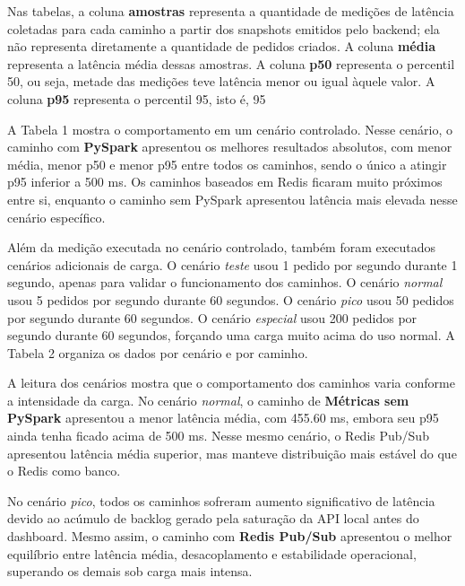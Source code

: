 ﻿\documentclass{article}
\begin{document}
Nas tabelas, a coluna \textbf{amostras} representa a quantidade de medições de latência coletadas para cada caminho a partir dos snapshots emitidos pelo backend; ela não representa diretamente a quantidade de pedidos criados. A coluna \textbf{média} representa a latência média dessas amostras. A coluna \textbf{p50} representa o percentil 50, ou seja, metade das medições teve latência menor ou igual àquele valor. A coluna \textbf{p95} representa o percentil 95, isto é, 95%

A Tabela 1 mostra o comportamento em um cenário controlado. Nesse cenário, o caminho com \textbf{PySpark} apresentou os melhores resultados absolutos, com menor média, menor p50 e menor p95 entre todos os caminhos, sendo o único a atingir p95 inferior a 500 ms. Os caminhos baseados em Redis ficaram muito próximos entre si, enquanto o caminho sem PySpark apresentou latência mais elevada nesse cenário específico.

Além da medição executada no cenário controlado, também foram executados cenários adicionais de carga. O cenário \textit{teste} usou 1 pedido por segundo durante 1 segundo, apenas para validar o funcionamento dos caminhos. O cenário \textit{normal} usou 5 pedidos por segundo durante 60 segundos. O cenário \textit{pico} usou 50 pedidos por segundo durante 60 segundos. O cenário \textit{especial} usou 200 pedidos por segundo durante 60 segundos, forçando uma carga muito acima do uso normal. A Tabela 2 organiza os dados por cenário e por caminho.

A leitura dos cenários mostra que o comportamento dos caminhos varia conforme a intensidade da carga. No cenário \textit{normal}, o caminho de \textbf{Métricas sem PySpark} apresentou a menor latência média, com 455.60 ms, embora seu p95 ainda tenha ficado acima de 500 ms. Nesse mesmo cenário, o Redis Pub/Sub apresentou latência média superior, mas manteve distribuição mais estável do que o Redis como banco.

No cenário \textit{pico}, todos os caminhos sofreram aumento significativo de latência devido ao acúmulo de backlog gerado pela saturação da API local antes do dashboard. Mesmo assim, o caminho com \textbf{Redis Pub/Sub} apresentou o melhor equilíbrio entre latência média, desacoplamento e estabilidade operacional, superando os demais sob carga mais intensa.
\end{document}

